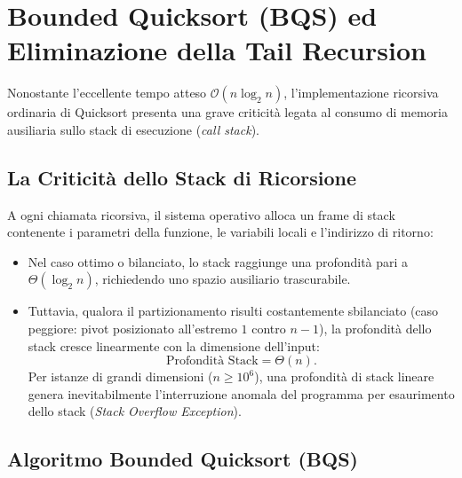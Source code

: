 \FloatBarrier
\section{Bounded Quicksort (BQS) ed Eliminazione della Tail Recursion}
\label{sec:bounded-quicksort}

Nonostante l'eccellente tempo atteso $\mathcal{O}(n \log_2 n)$, l'implementazione ricorsiva ordinaria di Quicksort presenta una grave criticità legata al consumo di memoria ausiliaria sullo stack di esecuzione (\textit{call stack}).

\FloatBarrier
\subsection{La Criticità dello Stack di Ricorsione}
\label{subsec:stack-overflow-issue}

A ogni chiamata ricorsiva, il sistema operativo alloca un frame di stack contenente i parametri della funzione, le variabili locali e l'indirizzo di ritorno:
\begin{itemize}
  \item Nel caso ottimo o bilanciato, lo stack raggiunge una profondità pari a $\Theta(\log_2 n)$, richiedendo uno spazio ausiliario trascurabile.
  \item Tuttavia, qualora il partizionamento risulti costantemente sbilanciato (caso peggiore: pivot posizionato all'estremo $1$ contro $n-1$), la profondità dello stack cresce linearmente con la dimensione dell'input:
  \begin{equation}
    \text{Profondità Stack} = \Theta(n).
  \end{equation}
  Per istanze di grandi dimensioni ($n \ge 10^6$), una profondità di stack lineare genera inevitabilmente l'interruzione anomala del programma per esaurimento dello stack (\textit{Stack Overflow Exception}).
\end{itemize}

\FloatBarrier
\subsection{Algoritmo Bounded Quicksort (BQS)}
\label{subsec:bqs-algorithm}

